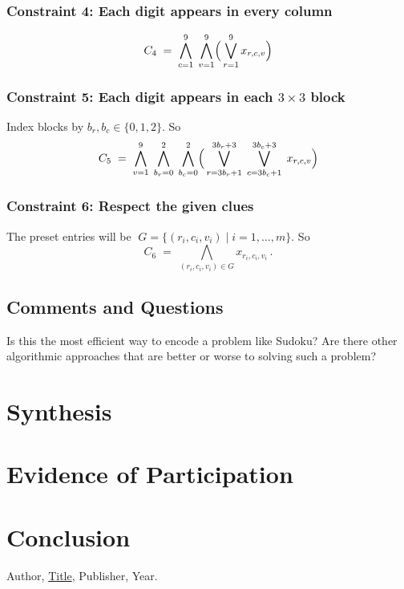 \documentclass{article}
\theoremstyle{theorem}
\theoremstyle{definition}
\theoremstyle{remark}
\begin{document}
\subsubsection*{Constraint 4: Each digit appears in every column}
\[
C_{4}\;=\;
\bigwedge_{c=1}^{9}\;\bigwedge_{v=1}^{9}
\Bigl(\,\bigvee_{r=1}^{9} x_{r,c,v}\Bigr)
\]

\subsubsection*{Constraint 5: Each digit appears in each \(3\times3\) block}
Index blocks by \(b_r,b_c\in\{0,1,2\}\).  So
\[
C_{5}\;=\;
\bigwedge_{v=1}^{9}\;\bigwedge_{b_r=0}^{2}\;\bigwedge_{b_c=0}^{2}
\Bigl(\,\bigvee_{r=3b_r+1}^{3b_r+3}\;\bigvee_{c=3b_c+1}^{3b_c+3}\;
x_{r,c,v}\Bigr)
\]

\subsubsection*{Constraint 6: Respect the given clues}
The preset entries will be
\(\;G=\{(r_i,c_i,v_i)\mid i=1,\dots,m\}.\)
So
\[
C_{6}\;=\;
\bigwedge_{(r_i,c_i,v_i)\in G} x_{r_i,c_i,v_i}\,.
\]

\subsection*{Comments and Questions}

Is this the most efficient way to encode a problem like Sudoku? Are there other algorithmic approaches that are better or worse to solving such a problem?

\section{Synthesis}

\section{Evidence of Participation}

\section{Conclusion}\label{conclusion}

\begin{thebibliography}{99}
 Author, \href{https://en.wikipedia.org/wiki/LaTeX}{Title}, Publisher, Year.
\end{thebibliography}
\end{document}
